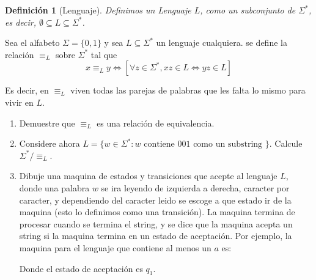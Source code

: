 \documentclass[letterpaper,11pt]{article}
\theoremstyle{plain}
\newtheorem{defi}{Definición}[section]
\begin{document}
\begin{enumerate}[\bf P5.]
        \begin{defi}[Lenguaje]
            Definimos un Lenguaje $L$, como un subconjunto de $\Sigma^*$, es decir, $\emptyset \subseteq L \subseteq \Sigma^*$.
        \end{defi}
        
    Sea el alfabeto $\Sigma=\{0,1\}$ y sea $L\subseteq \Sigma^*$ un lenguaje cualquiera. se define la relación $\equiv_L$ sobre $\Sigma^*$ tal que
        $$ x\equiv_Ly \iff [\forall z\in \Sigma^*, xz \in L \Leftrightarrow yz\in L]$$
    
    Es decir, en $\equiv_L$ viven todas las parejas de palabras que les falta lo mismo para vivir en $L$.
    \begin{enumerate}
        \item Demuestre que $\equiv_L$ es una relación de equivalencia.
        \item Considere ahora $L=\{w \in \Sigma^* : w \text{ contiene } 001 \text{ como un substring } \}$. Calcule $\Sigma^*/\equiv_L$.
        \item Dibuje una maquina de estados y transiciones que acepte al lenguaje $L$, donde una palabra $w$ se ira leyendo de izquierda a derecha, caracter por caracter, y dependiendo del caracter leido se escoge a que estado ir de la maquina (esto lo definimos como una transición). La maquina termina de procesar cuando se termina el string, y se dice que la maquina acepta un string si la maquina termina en un estado de aceptación. 
        Por ejemplo, la maquina para el lenguaje que contiene al menos un $a$ es:
        
        \begin{center}
        \end{center}
        
        Donde el estado de aceptación es $q_1$.
    \end{enumerate} 
\end{enumerate}
 
\end{document}
